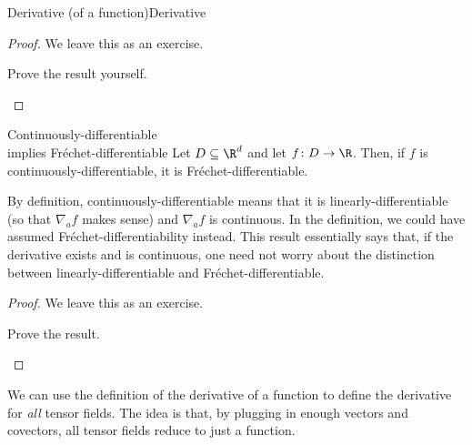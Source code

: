 \begin{prp}{Derivative (of a function)}{Derivative}
\begin{rmk}
\end{rmk}
\begin{proof}
We leave this as an exercise.
\begin{exr}[breakable=false]{}{}
Prove the result yourself.
\end{exr}
\end{proof}
\end{prp}
\begin{prp}{Continuously-differentiable \\ implies Fréchet-differentiable}{}
	Let $D\subseteq \R ^d$ and let $f\colon D\rightarrow \R$.  Then, if $f$ is continuously-differentiable, it is Fréchet-differentiable.
	\begin{rmk}
		By definition, continuously-differentiable means that it is linearly-differentiable (so that $\nabla _af$ makes sense) and $\nabla _af$ is continuous.  In the definition, we could have assumed Fréchet-differentiability instead.  This result essentially says that, if the derivative exists and is continuous, one need not worry about the distinction between linearly-differentiable and Fréchet-differentiable.
	\end{rmk}
	\begin{proof}
		We leave this as an exercise.
		\begin{exr}[breakable=false]{}{}
			Prove the result.
		\end{exr}
	\end{proof}
\end{prp}
We can use the definition of the derivative of a function to define the derivative for \emph{all} tensor fields.  The idea is that, by plugging in enough vectors and covectors, all tensor fields reduce to just a function.
